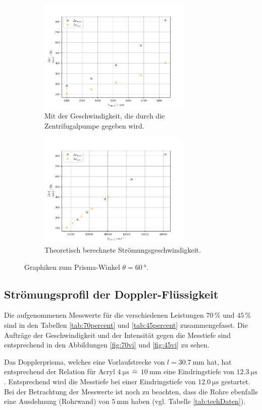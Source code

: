 \begin{figure}
    \centering
    \begin{subfigure}{0.48\textwidth}
        \centering
        \includegraphics[height=5.5cm]{plots/45_2.pdf}
        \caption{Mit der Geschwindigkeit, die durch die Zentrifugalpumpe gegeben wird.}
        \label{fig:exp45}
    \end{subfigure}
    \begin{subfigure}{0.48\textwidth}
        \centering
        \includegraphics[height=5.5cm]{plots/45_1.pdf}
        \caption{Theoretisch berechnete Strömungsgeschwindigkeit.}
        \label{fig:theo45}
    \end{subfigure}
    \caption{Graphiken zum Prisma-Winkel $\theta=\SI{60}{\degree}$.}
    \label{fig:45}
\end{figure}

\subsection{Strömungsprofil der Doppler-Flüssigkeit}

Die aufgenommenen Messwerte für die verschiedenen Leistungen $70\,\%$ und $45\,\%$ sind in den Tabellen \ref{tab:70percent}
und \ref{tab:45percent} zusammengefasst. 
Die Aufträge der Geschwindigkeit und der Intensität gegen die Messtiefe sind entsprechend in den Abbildungen \ref{fig:70vi} 
und \ref{fig:45vi} zu sehen. 

Das Dopplerprisma, welches eine Vorlaufstrecke von $l=\SI{30.7}{\milli\meter}$ hat, hat entsprechend der Relation für 
Acryl $\SI{4}{\micro\second}\,\widehat{=}\,\SI{10}{\milli\meter}$ eine Eindringstiefe von $\SI{12.3}{\micro\second}$. 
Entsprechend wird die Messtiefe bei einer Eindringstiefe von $\SI{12.0}{\micro\second}$ gestartet. 
Bei der Betrachtung der Messwerte ist noch zu beachten, dass die Rohre ebenfalls eine Ausdehnung (Rohrwand)
von $\SI{5}{\milli\meter}$ haben (vgl. Tabelle \ref{tab:techDaten}). 

